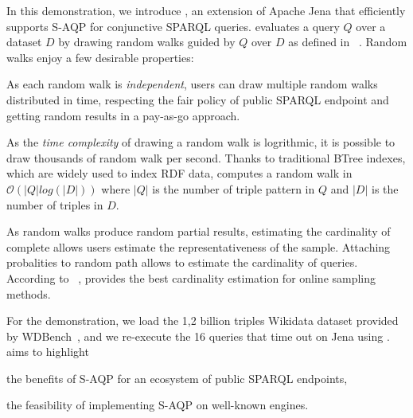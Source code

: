 In this demonstration, we introduce \NAME, an extension of Apache Jena
that efficiently supports S-AQP for conjunctive SPARQL queries. \NAME
evaluates a query $Q$ over a dataset $D$ by drawing random walks
guided by $Q$ over $D$ as defined in
\WANDER~\cite{li2019wanderjoin}. Random walks enjoy a few desirable
properties:
\begin{inparaenum}[(i)]
\item As each random walk is \emph{independent}, users can draw
  multiple random walks distributed in time, respecting the fair
  policy of public SPARQL endpoint and getting random results in a
  pay-as-go approach.
\item As the \emph{time complexity} of drawing a random walk is
  logrithmic, it is possible to draw thousands of random walk per
  second. Thanks to traditional BTree indexes, which are widely used
  to index RDF data, \NAME computes a random walk in
  $\mathcal{O}(|Q|log(|D|))$ where $|Q|$ is the number of triple
  pattern in $Q$ and $|D|$ is the number of triples in $D$.
\item As random walks produce random partial results, estimating the
  cardinality of complete allows users estimate the representativeness
  of the sample. Attaching probalities to random path allows to
  estimate the cardinality of
  queries\cite{li2019wanderjoin}. According to
  ~\cite{DBLP:conf/sigmod/ParkKBKHH20}, \WANDER provides the best
  cardinality estimation for online sampling methods.
\end{inparaenum}


%
%

For the demonstration, we load the 1,2 billion triples Wikidata dataset
provided by WDBench~\cite{angles2022wdbench}, and
we re-execute the 16 queries that time out on Jena using \NAME. %
%
\NAME aims to highlight
\begin{inparaenum}[(i)]
\item the benefits of S-AQP for an ecosystem of public SPARQL endpoints,
\item the feasibility of implementing S-AQP on well-known engines.
\end{inparaenum}

